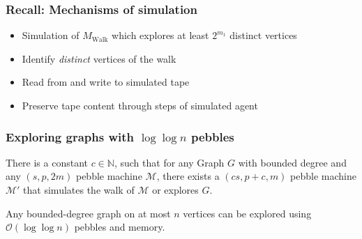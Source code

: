 \documentclass{beamer}
\begin{document}
\begin{frame}
  \frametitle{Recall: Mechanisms of simulation}
  \begin{itemize}
    \item Simulation of $M_{\text{Walk}}$ which explores at least $2^{m_{1}}$
      distinct vertices 
    \item Identify \emph{distinct} vertices of the walk
    \item Read from and write to simulated tape 
    \item Preserve tape content through steps of simulated agent
  \end{itemize}
\end{frame}

\begin{frame}
  \frametitle{Exploring graphs with $\log\log n$ pebbles}
  \begin{theorem}
    There is a constant $c\in\mathbb{N}$, such that for any Graph $G$
    with bounded degree and any $(s,p,2m)$ pebble machine $\mathcal{M}$,
    there exists a $(cs,p+c,m)$ pebble machine $\mathcal{M}'$ that simulates
    the walk of $\mathcal{M}$ or explores $G$.
  \end{theorem}
  \begin{center}
  \end{center}
  \begin{theorem}
    Any bounded-degree graph on at most $n$ vertices can be explored using
    $\mathcal{O}(\log\log n)$ pebbles and memory.
  \end{theorem}
\end{frame}
\end{document}
